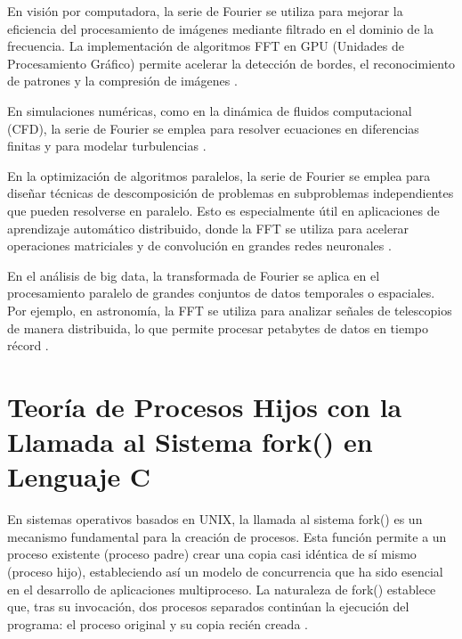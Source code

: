 {En visión por computadora, la serie de Fourier se utiliza para mejorar la eficiencia del procesamiento de imágenes mediante filtrado en el dominio de la frecuencia. La implementación de algoritmos FFT en GPU (Unidades de Procesamiento Gráfico) permite acelerar la detección de bordes, el reconocimiento de patrones y la compresión de imágenes \cite{moreland2003fft}.
\vspace{10pt}

En simulaciones numéricas, como en la dinámica de fluidos computacional (CFD), la serie de Fourier se emplea para resolver ecuaciones en diferencias finitas y para modelar turbulencias \cite{canuto2006spectral}.

\vspace{10pt}

En la optimización de algoritmos paralelos, la serie de Fourier se emplea para diseñar técnicas de descomposición de problemas en subproblemas independientes que pueden resolverse en paralelo. Esto es especialmente útil en aplicaciones de aprendizaje automático distribuido, donde la FFT se utiliza para acelerar operaciones matriciales y de convolución en grandes redes neuronales \cite{goodfellow2016deep}.
\vspace{10pt}

En el análisis de big data, la transformada de Fourier se aplica en el procesamiento paralelo de grandes conjuntos de datos temporales o espaciales. Por ejemplo, en astronomía, la FFT se utiliza para analizar señales de telescopios de manera distribuida, lo que permite procesar petabytes de datos en tiempo récord \cite{bracewell2003fourier}.

\section{Teoría de Procesos Hijos con la Llamada al Sistema fork() en Lenguaje C}

En sistemas operativos basados en UNIX, la llamada al sistema fork() es un mecanismo fundamental para la creación de procesos. Esta función permite a un proceso existente (proceso padre) crear una copia casi idéntica de sí mismo (proceso hijo), estableciendo así un modelo de concurrencia que ha sido esencial en el desarrollo de aplicaciones multiproceso. La naturaleza de fork() establece que, tras su invocación, dos procesos separados continúan la ejecución del programa: el proceso original y su copia recién creada \cite{stevens2013advanced}.
\vspace{10pt}

}
